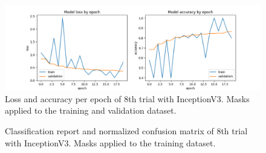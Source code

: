 \documentclass{article}
\begin{document}
\begin{figure}%
    \centering
    \includegraphics[width=1.0\linewidth]{inceptionv3_12_loss_accuracy.png}
    \caption{Loss and accuracy per epoch of 8th trial with InceptionV3. Masks applied to the training and validation dataset.}
    \label{fig:inceptionv3_12_loss_accuracy}
\end{figure}

\begin{figure}%
  \centering
  \qquad
  \caption{Classification report and normalized confusion matrix of 8th trial with InceptionV3. Masks applied to the training dataset.}
  \label{fig:inceptionv3_11_results}
\end{figure}
\end{document}
